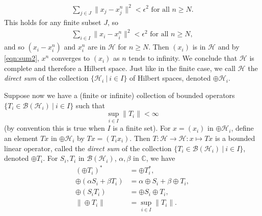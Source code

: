 \documentclass[12pt,a4paper]{report}
\theoremstyle{plain}
\theoremstyle{definition}
\newcommand{\1}{\mathbbm{1}}
\newcommand{\C}{\mathbb{C}}
\renewcommand{\H}{\mathcal{H}}
\newcommand{\B}{\mathcal{B}}
\begin{document}
\begin{align}\label{eqn:sum2}
	\sum_{j\in J}{\|x_j-x^n_j\|^2} < \epsilon^2  \mbox{ for all } n\geq N.
\end{align}
This holds for any finite subset $J$, so
\begin{align*}
	\sum_{i\in I}{\|x_i-x^n_i\|^2} < \epsilon^2  \mbox{ for all } n\geq N,
\end{align*}
and so $(x_i-x^n_i)$ and $x^n_i$ are in $\H$ for $n\geq N$. 
Then $(x_i)$ is in $\H$ and by \eqref{eqn:sum2}, $x^n$ converges to $(x_i)$ as $n$ tends 
to infinity. We conclude that $\H$ is complete and therefore a Hilbert space. Just like in the finite 
case, we call $\H$ the \emph{direct sum} of the collection $\{\H_i ~|~ i\in I\}$ of Hilbert spaces, 
denoted $\oplus\H_i$.

Suppose now we have a (finite or infinite) collection of bounded operators 
$\{T_i\in\B{(\H_i)} ~|~ i\in I\}$ such that 
\[
	\sup_{i\in I} {\|T_i\|} < \infty
\] 
(by convention this is true when $I$ is a finite set).
For $x=(x_i)$ in $\oplus\H_i$, define an element $Tx$ in $\oplus\H_i$ by $Tx=(T_ix_i)$. 
Then $T:\H\to\H:x\mapsto Tx$ is a bounded linear operator, called the \emph{direct sum} of the 
collection $\{T_i\in\B{(\H_i)} ~|~ i \in I\}$, denoted $\oplus T_i$. For $S_i,T_i$ in 
$\B(\H_i)$, $\alpha,\beta$ in $\C$, we have 
\begin{align*}
		\left(\oplus T_i\right)^\ast &= \oplus T_i^\ast,		\\
		\oplus (\alpha S_i+\beta T_i) &= 
					\alpha \oplus S_i + \beta \oplus T_i, 		\\
		\oplus (S_i T_i) &= \oplus S_i \oplus T_i,				\\
		\|\oplus T_i\| &= \sup_{i\in I} {\|T_i\|}.				\\
\end{align*}
\end{document}
